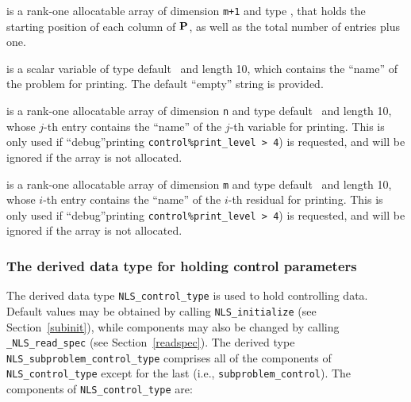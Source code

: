 \documentclass{galahad}
\newcommand{\packagename}{NLS}
\newcommand{\fullpackagename}{\libraryname\_\packagename}
\begin{document}
\begin{description}
\begin{description}
 is a rank-one allocatable array of dimension {\tt m+1}
and type \integer, that holds the starting position of
each column of ${\mathbf{P}}$, as well as the total number of entries plus one.

\end{description}

 is a scalar variable of type
default \character\ and length 10, which contains the
``name'' of the problem for printing. The default ``empty'' string is
provided.

 is a rank-one allocatable array of dimension {\tt n} and type
default \character\ and length 10, whose $j$-th entry contains the
``name'' of the $j$-th variable for printing. This is only used
if ``debug''printing {\tt control\%print\_level > 4}) is requested,
and will be ignored if the array is not allocated.

 is a rank-one allocatable array of dimension {\tt m} and type
default \character\ and length 10, whose $i$-th entry contains the
``name'' of the $i$-th residual for printing. This is only used
if ``debug''printing {\tt control\%print\_level > 4}) is requested,
and will be ignored if the array is not allocated.

\end{description}


\subsubsection{The derived data type for holding control
 parameters}\label{typecontrol}
The derived data type
{\tt \packagename\_control\_type}
is used to hold controlling data. Default values may be obtained by calling
{\tt \packagename\_initialize}
(see Section~\ref{subinit}),
while components may also be changed by calling
{\tt \fullpackagename\_read\-\_spec}
(see Section~\ref{readspec}).
The derived type {\tt \packagename\_subproblem\_control\_type}
comprises all of the components of {\tt \packagename\_control\_type}
except for the last (i.e., {\tt subproblem\_control}).
The components of
{\tt \packagename\_control\_type}
are:
\end{document}
